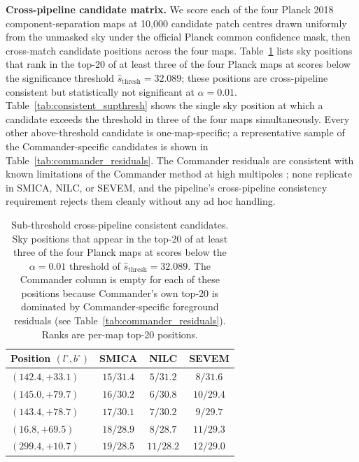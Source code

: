 \documentclass[fleqn,usenatbib]{mnras}
\begin{document}
\textbf{Cross-pipeline candidate matrix.} We score each of the four Planck 2018 component-separation maps at 10{,}000 candidate patch centres drawn uniformly from the unmasked sky under the official Planck common confidence mask, then cross-match candidate positions across the four maps. Table~\ref{tab:consistent_subthresh} lists sky positions that rank in the top-20 of at least three of the four Planck maps at scores below the significance threshold $\hat{s}_{\text{thresh}} = 32.089$; these positions are cross-pipeline consistent but statistically not significant at $\alpha = 0.01$. Table~\ref{tab:consistent_supthresh} shows the single sky position at which a candidate exceeds the threshold in three of the four maps simultaneously. Every other above-threshold candidate is one-map-specific; a representative sample of the Commander-specific candidates is shown in Table~\ref{tab:commander_residuals}. The Commander residuals are consistent with known limitations of the Commander method at high multipoles \citep{planck2018_iv}; none replicate in SMICA, NILC, or SEVEM, and the pipeline's cross-pipeline consistency requirement rejects them cleanly without any ad hoc handling.

\begin{table}
\centering
\caption{Sub-threshold cross-pipeline consistent candidates. Sky positions that appear in the top-20 of at least three of the four Planck maps at scores below the $\alpha = 0.01$ threshold of $\hat{s}_{\text{thresh}} = 32.089$. The Commander column is empty for each of these positions because Commander's own top-20 is dominated by Commander-specific foreground residuals (see Table~\ref{tab:commander_residuals}). Ranks are per-map top-20 positions.}
\label{tab:consistent_subthresh}
\small
\begin{tabular}{lccc}
\hline
Position $(l^\circ, b^\circ)$ & SMICA & NILC & SEVEM \\
\hline
$(142.4, +33.1)$ & $15 / 31.4$ & $5 / 31.2$ & $8 / 31.6$ \\
$(145.0, +79.7)$ & $16 / 30.2$ & $6 / 30.8$ & $10 / 29.4$ \\
$(143.4, +78.7)$ & $17 / 30.1$ & $7 / 30.2$ & $9 / 29.7$ \\
$(16.8, +69.5)$  & $18 / 28.9$ & $8 / 28.7$ & $11 / 29.3$ \\
$(299.4, +10.7)$ & $19 / 28.5$ & $11 / 28.2$ & $12 / 29.0$ \\
\hline
\end{tabular}
\end{table}
\end{document}
